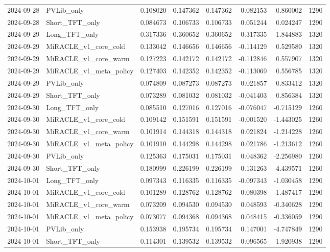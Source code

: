 \begin{tabular}{llrrrrrr}
2024-09-28 & PVLib_only & 0.108020 & 0.147362 & 0.147362 & 0.082153 & -0.860002 & 1290 \\
2024-09-28 & Short_TFT_only & 0.084673 & 0.106733 & 0.106733 & 0.051244 & 0.024247 & 1290 \\
2024-09-29 & Long_TFT_only & 0.317336 & 0.360652 & 0.360652 & -0.317335 & -1.844883 & 1320 \\
2024-09-29 & MiRACLE_v1_core_cold & 0.133042 & 0.146656 & 0.146656 & -0.114129 & 0.529580 & 1320 \\
2024-09-29 & MiRACLE_v1_core_warm & 0.127223 & 0.142172 & 0.142172 & -0.112846 & 0.557907 & 1320 \\
2024-09-29 & MiRACLE_v1_meta_policy & 0.127403 & 0.142352 & 0.142352 & -0.113069 & 0.556785 & 1320 \\
2024-09-29 & PVLib_only & 0.074809 & 0.087273 & 0.087273 & 0.021857 & 0.833412 & 1320 \\
2024-09-29 & Short_TFT_only & 0.073289 & 0.081032 & 0.081032 & -0.041403 & 0.856384 & 1320 \\
2024-09-30 & Long_TFT_only & 0.085510 & 0.127016 & 0.127016 & -0.076047 & -0.715129 & 1260 \\
2024-09-30 & MiRACLE_v1_core_cold & 0.109142 & 0.151591 & 0.151591 & -0.001520 & -1.443025 & 1260 \\
2024-09-30 & MiRACLE_v1_core_warm & 0.101914 & 0.144318 & 0.144318 & 0.021824 & -1.214228 & 1260 \\
2024-09-30 & MiRACLE_v1_meta_policy & 0.101910 & 0.144298 & 0.144298 & 0.021786 & -1.213612 & 1260 \\
2024-09-30 & PVLib_only & 0.125363 & 0.175031 & 0.175031 & 0.048362 & -2.256980 & 1260 \\
2024-09-30 & Short_TFT_only & 0.180999 & 0.226199 & 0.226199 & 0.131263 & -4.439571 & 1260 \\
2024-10-01 & Long_TFT_only & 0.097343 & 0.116335 & 0.116335 & -0.097343 & -1.030458 & 1290 \\
2024-10-01 & MiRACLE_v1_core_cold & 0.101289 & 0.128762 & 0.128762 & 0.080398 & -1.487417 & 1290 \\
2024-10-01 & MiRACLE_v1_core_warm & 0.073209 & 0.094530 & 0.094530 & 0.048593 & -0.340628 & 1290 \\
2024-10-01 & MiRACLE_v1_meta_policy & 0.073077 & 0.094368 & 0.094368 & 0.048415 & -0.336059 & 1290 \\
2024-10-01 & PVLib_only & 0.153938 & 0.195734 & 0.195734 & 0.147001 & -4.747849 & 1290 \\
2024-10-01 & Short_TFT_only & 0.114301 & 0.139532 & 0.139532 & 0.096565 & -1.920938 & 1290 \\

\end{tabular}
